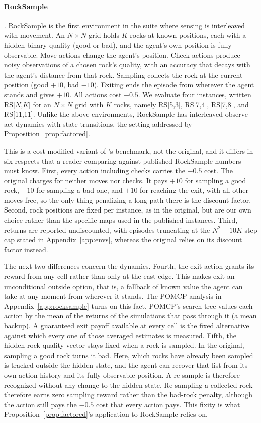 \paragraph{RockSample} \citep{smith2004}. RockSample is the first environment in the suite where sensing is interleaved with movement. An $N{\times}N$ grid holds $K$ rocks at known positions, each with a hidden binary quality (good or bad), and the agent's own position is fully observable. Move actions change the agent's position. Check actions produce noisy observations of a chosen rock's quality, with an accuracy that decays with the agent's distance from that rock. Sampling collects the rock at the current position (good $+10$, bad $-10$). Exiting ends the episode from wherever the agent stands and gives $+10$. All actions cost $-0.5$. We evaluate four instances, written RS[$N$,$K$] for an $N{\times}N$ grid with $K$ rocks, namely RS[5,3], RS[7,4], RS[7,8], and RS[11,11]. Unlike the above environments, RockSample has interleaved observe-act dynamics with state transitions, the setting addressed by Proposition~\ref{prop:factored}.

This is a cost-modified variant of \citet{smith2004}'s benchmark, not the original, and it differs in six respects that a reader comparing against published RockSample numbers must know. First, every action including checks carries the $-0.5$ cost. The original charges for neither moves nor checks. It pays $+10$ for sampling a good rock, $-10$ for sampling a bad one, and $+10$ for reaching the exit, with all other moves free, so the only thing penalizing a long path there is the discount factor. Second, rock positions are fixed per instance, as in the original, but are our own choice rather than the specific maps used in the published instances. Third, returns are reported undiscounted, with episodes truncating at the $N^2{+}10K$ step cap stated in Appendix~\ref{app:envs}, whereas the original relies on its discount factor instead.

The next two differences concern the dynamics. Fourth, the exit action grants its reward from any cell rather than only at the east edge. This makes exit an unconditional outside option, that is, a fallback of known value the agent can take at any moment from wherever it stands. The POMCP analysis in Appendix~\ref{app:rocksample} turns on this fact. POMCP's search tree values each action by the mean of the returns of the simulations that pass through it (a mean backup). A guaranteed exit payoff available at every cell is the fixed alternative against which every one of those averaged estimates is measured. Fifth, the hidden rock-quality vector stays fixed when a rock is sampled. In the original, sampling a good rock turns it bad. Here, which rocks have already been sampled is tracked outside the hidden state, and the agent can recover that list from its own action history and its fully observable position. A re-sample is therefore recognized without any change to the hidden state. Re-sampling a collected rock therefore earns zero sampling reward rather than the bad-rock penalty, although the action still pays the $-0.5$ cost that every action pays. This fixity is what Proposition~\ref{prop:factored}'s application to RockSample relies on.

